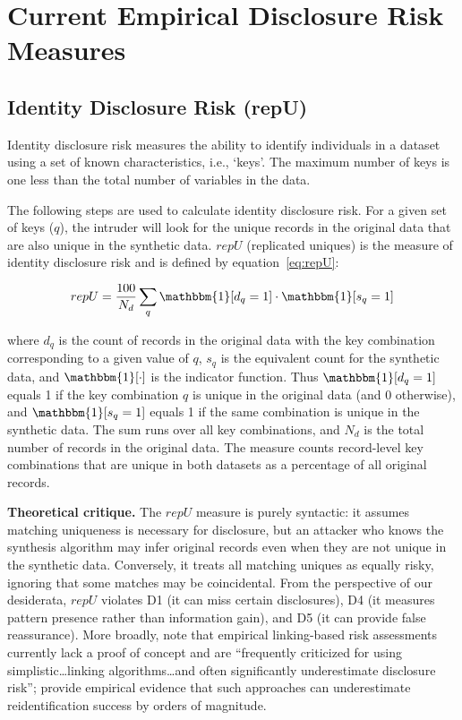 \documentclass[Afour,sageh,times,doublespace]{sagej}
\begin{document}

\section{Current Empirical Disclosure Risk Measures}
\label{sec:measures}

\subsection{Identity Disclosure Risk (repU)}

Identity disclosure risk measures the ability to identify individuals in a dataset using a set of known characteristics, i.e., `keys'. The maximum number of keys is one less than the total number of variables in the data.

The following steps are used to calculate identity disclosure risk. For a given set of keys ($q$), the intruder will look for the unique records in the original data that are also unique in the synthetic data. $repU$ (replicated uniques) is the measure of identity disclosure risk and is defined by equation~\ref{eq:repU}:

\begin{equation}
repU = \frac{100}{N_d} \sum_{q} \mathbbm{1}[d_{q} = 1] \cdot \mathbbm{1}[s_{q} = 1]
\label{eq:repU}
\end{equation}

where $d_{q}$ is the count of records in the original data with the key combination corresponding to a given value of $q$, $s_{q}$ is the equivalent count for the synthetic data, and $\mathbbm{1}[\cdot]$ is the indicator function. Thus $\mathbbm{1}[d_{q} = 1]$ equals 1 if the key combination $q$ is unique in the original data (and 0 otherwise), and $\mathbbm{1}[s_{q} = 1]$ equals 1 if the same combination is unique in the synthetic data. The sum runs over all key combinations, and $N_d$ is the total number of records in the original data. The measure counts record-level key combinations that are unique in both datasets as a percentage of all original records.

\textbf{Theoretical critique.} The $repU$ measure is purely syntactic: it assumes matching uniqueness is necessary for disclosure, but an attacker who knows the synthesis algorithm may infer original records even when they are not unique in the synthetic data. Conversely, it treats all matching uniques as equally risky, ignoring that some matches may be coincidental. From the perspective of our desiderata, $repU$ violates D1 (it can miss certain disclosures), D4 (it measures pattern presence rather than information gain), and D5 (it can provide false reassurance). More broadly, \citet{Jarmin2023} note that empirical linking-based risk assessments currently lack a proof of concept and are ``frequently criticized for using simplistic\ldots linking algorithms\ldots and often significantly underestimate disclosure risk''; \citet{Rocher2019} provide empirical evidence that such approaches can underestimate reidentification success by orders of magnitude.
\end{document}

